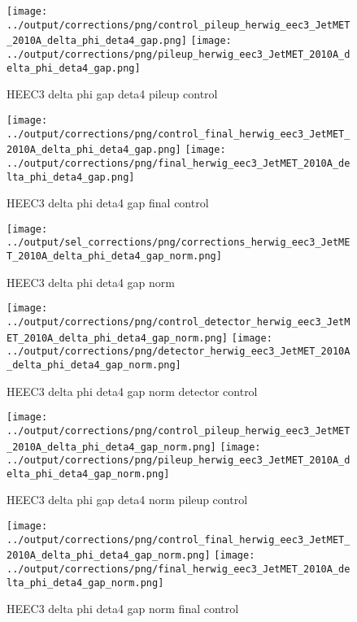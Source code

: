 \documentclass[11pt]{book}
\begin{document}
\begin{figure}[ht]
\centering
\texttt{[image: ../output/corrections/png/control\_pileup\_herwig\_eec3\_JetMET\_2010A\_delta\_phi\_deta4\_gap.png]}
\texttt{[image: ../output/corrections/png/pileup\_herwig\_eec3\_JetMET\_2010A\_delta\_phi\_deta4\_gap.png]}
\caption{HEEC3 delta phi gap deta4 pileup control}
\label{fig:HEEC3_JetMET_2010A_delta_phi_deta4_gap_pileup_control}
\end{figure}


\begin{figure}[ht]
\centering
\texttt{[image: ../output/corrections/png/control\_final\_herwig\_eec3\_JetMET\_2010A\_delta\_phi\_deta4\_gap.png]}
\texttt{[image: ../output/corrections/png/final\_herwig\_eec3\_JetMET\_2010A\_delta\_phi\_deta4\_gap.png]}
\caption{HEEC3 delta phi deta4 gap final control}
\label{fig:HEEC3_JetMET_2010A_delta_phi_deta4_gap_final_control}
\end{figure}


\begin{figure}[ht]
\centering
\texttt{[image: ../output/sel\_corrections/png/corrections\_herwig\_eec3\_JetMET\_2010A\_delta\_phi\_deta4\_gap\_norm.png]}
\caption{HEEC3 delta phi deta4 gap norm}
\label{fig:HEEC3_JetMET_2010A_delta_phi_deta4_gap_norm}
\end{figure}


\begin{figure}[ht]
\centering
\texttt{[image: ../output/corrections/png/control\_detector\_herwig\_eec3\_JetMET\_2010A\_delta\_phi\_deta4\_gap\_norm.png]}
\texttt{[image: ../output/corrections/png/detector\_herwig\_eec3\_JetMET\_2010A\_delta\_phi\_deta4\_gap\_norm.png]}
\caption{HEEC3 delta phi deta4 gap norm detector control}
\label{fig:HEEC3_JetMET_2010A_delta_phi_deta4_gap_norm_detector_control}
\end{figure}

\begin{figure}[ht]
\centering
\texttt{[image: ../output/corrections/png/control\_pileup\_herwig\_eec3\_JetMET\_2010A\_delta\_phi\_deta4\_gap\_norm.png]}
\texttt{[image: ../output/corrections/png/pileup\_herwig\_eec3\_JetMET\_2010A\_delta\_phi\_deta4\_gap\_norm.png]}
\caption{HEEC3 delta phi gap deta4 norm pileup control}
\label{fig:HEEC3_JetMET_2010A_delta_phi_deta4_gap_norm_pileup_control}
\end{figure}


\begin{figure}[ht]
\centering
\texttt{[image: ../output/corrections/png/control\_final\_herwig\_eec3\_JetMET\_2010A\_delta\_phi\_deta4\_gap\_norm.png]}
\texttt{[image: ../output/corrections/png/final\_herwig\_eec3\_JetMET\_2010A\_delta\_phi\_deta4\_gap\_norm.png]}
\caption{HEEC3 delta phi deta4 gap norm final control}
\label{fig:HEEC3_JetMET_2010A_delta_phi_deta4_gap_norm_final_control}
\end{figure}
\end{document}
